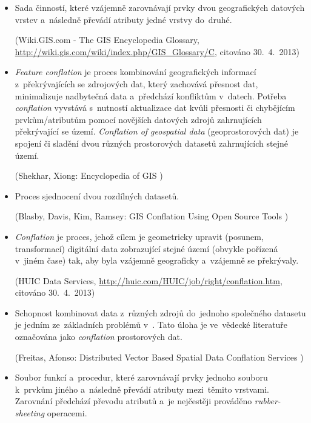 \begin{itemize}

  \item Sada činností, které vzájemně zarovnávají prvky dvou geografických
    datových vrstev a~následně převádí atributy jedné vrstvy do~druhé.
    
    (Wiki.GIS.com - The GIS Encyclopedia Glossary, 
    \url{http://wiki.gis.com/wiki/index.php/GIS\_Glossary/C},
    citováno 30.~4.~2013)

  \item \textit{Feature conflation} je proces kombinování geografických 
    informací z~překrývajících se zdrojových dat, který zachovává přesnost 
    dat, minimalizuje nadbytečná data a~předchází konfliktům v~datech.
    Potřeba \textit{conflation} vyvstává s~nutností aktualizace dat kvůli
    přesnosti či chybějícím prvkům/atributům pomocí novějších datových zdrojů
    zahrnujících překrývající se území.
    \textit{Conflation of geospatial data} (geoprostorových dat) je spojení
    či sladění dvou různých prostorových datasetů zahrnujících stejné území.
     
    (Shekhar, Xiong: Encyclopedia of GIS \cite[][s.~129]{gisencyclopedia})

  \item Proces sjednocení dvou rozdílných datasetů.
    
    (Blasby, Davis, Kim, Ramsey: GIS Conflation Using Open Source Tools 
    \cite[][s.~2]{opensourceconflation})

 \item \textit{Conflation} je proces, jehož cílem je geometricky upravit 
    (posunem, transformací) di\-gitální data zobrazující stejné území 
    (obvykle pořízená v~jiném čase) tak, aby byla vzájemně geograficky 
     a~vzájemně se překrývaly.
    
    (HUIC Data Services, \url{http://huic.com/HUIC/job/right/conflation.htm}, 
     citováno 30.~4.~2013)

  \item Schopnost kombinovat data z~různých zdrojů do~jednoho společného
    datasetu je jedním ze~základních problémů v~. Tato úloha je
    ve~vědecké literatuře označována jako \textit{conflation} prostorových
    dat.
   
    (Freitas, Afonso: Distributed Vector Based Spatial Data Conflation 
    Services \cite[][s.~23]{freitas})

  \item Soubor funkcí a~procedur, které zarovnávají prvky jednoho  
    souboru k~prvkům jiného a~následně převádí atributy mezi~těmito vrstvami.
    Zarovnání předchází převodu atributů a~je nejčestěji prováděno 
    \textit{rubber-sheeting} operacemi.
   

\end{itemize}
